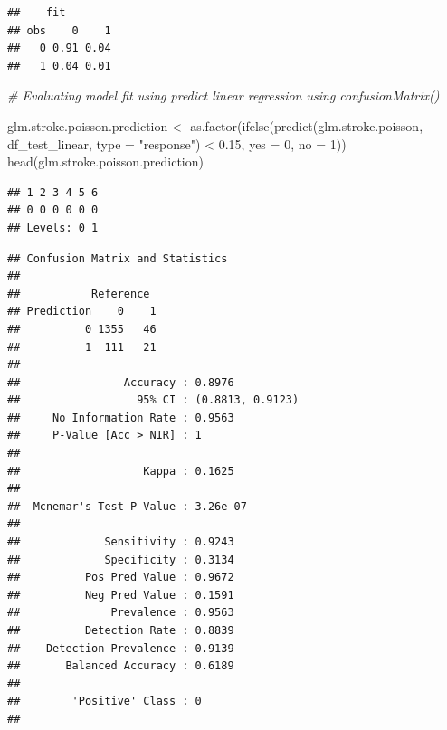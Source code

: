 \documentclass[
]{article}
\newenvironment{Shaded}{\begin{snugshade}}{\end{snugshade}}
\newcommand{\AttributeTok}[1]{\textcolor[rgb]{0.77,0.63,0.00}{#1}}
\newcommand{\CommentTok}[1]{\textcolor[rgb]{0.56,0.35,0.01}{\textit{#1}}}
\newcommand{\DecValTok}[1]{\textcolor[rgb]{0.00,0.00,0.81}{#1}}
\newcommand{\FloatTok}[1]{\textcolor[rgb]{0.00,0.00,0.81}{#1}}
\newcommand{\FunctionTok}[1]{\textcolor[rgb]{0.00,0.00,0.00}{#1}}
\newcommand{\NormalTok}[1]{#1}
\newcommand{\OtherTok}[1]{\textcolor[rgb]{0.56,0.35,0.01}{#1}}
\newcommand{\SpecialCharTok}[1]{\textcolor[rgb]{0.00,0.00,0.00}{#1}}
\newcommand{\StringTok}[1]{\textcolor[rgb]{0.31,0.60,0.02}{#1}}
\renewcommand{\=}[1]{\stackrel{#1}{=}}
\theoremstyle{definition}
\theoremstyle{remark}
\begin{document}
\begin{verbatim}
##    fit
## obs    0    1
##   0 0.91 0.04
##   1 0.04 0.01
\end{verbatim}

\begin{Shaded}
\begin{Highlighting}[]
\CommentTok{\# Evaluating model fit using predict linear regression using confusionMatrix()}

\NormalTok{glm.stroke.poisson.prediction }\OtherTok{\textless{}{-}} \FunctionTok{as.factor}\NormalTok{(}\FunctionTok{ifelse}\NormalTok{(}\FunctionTok{predict}\NormalTok{(glm.stroke.poisson, df\_test\_linear, }\AttributeTok{type =} \StringTok{"response"}\NormalTok{) }\SpecialCharTok{\textless{}} \FloatTok{0.15}\NormalTok{, }\AttributeTok{yes =} \DecValTok{0}\NormalTok{, }\AttributeTok{no =} \DecValTok{1}\NormalTok{))}
\FunctionTok{head}\NormalTok{(glm.stroke.poisson.prediction)}
\end{Highlighting}
\end{Shaded}

\begin{verbatim}
## 1 2 3 4 5 6 
## 0 0 0 0 0 0 
## Levels: 0 1
\end{verbatim}

\begin{Shaded}
\end{Shaded}

\begin{verbatim}
## Confusion Matrix and Statistics
## 
##           Reference
## Prediction    0    1
##          0 1355   46
##          1  111   21
##                                           
##                Accuracy : 0.8976          
##                  95% CI : (0.8813, 0.9123)
##     No Information Rate : 0.9563          
##     P-Value [Acc > NIR] : 1               
##                                           
##                   Kappa : 0.1625          
##                                           
##  Mcnemar's Test P-Value : 3.26e-07        
##                                           
##             Sensitivity : 0.9243          
##             Specificity : 0.3134          
##          Pos Pred Value : 0.9672          
##          Neg Pred Value : 0.1591          
##              Prevalence : 0.9563          
##          Detection Rate : 0.8839          
##    Detection Prevalence : 0.9139          
##       Balanced Accuracy : 0.6189          
##                                           
##        'Positive' Class : 0               
## 
\end{verbatim}
\end{document}
